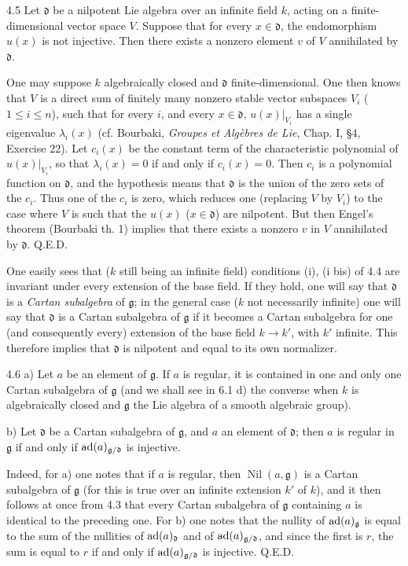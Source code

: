 \begin{lemma}{4.5}\label{XIII.4.5}
Let $\mathfrak d$ be a nilpotent Lie algebra over an infinite field
$k$, acting on a finite-dimensional vector space $V$. Suppose that
for every $x\in\mathfrak d$, the endomorphism $u(x)$ is not injective.
Then there exists a nonzero element $v$ of $V$ annihilated by
$\mathfrak d$.
\end{lemma}
One may suppose $k$ algebraically closed and $\mathfrak d$
finite-dimensional. One then knows that $V$ is a direct sum of finitely
many nonzero stable vector subspaces $V_i$ ($1\leq i\leq n$), such
that for every $i$, and every $x\in\mathfrak d$, $u(x)|_{V_i}$ has a
single eigenvalue $\lambda_i(x)$ (cf. Bourbaki, \emph{Groupes et
Alg\`ebres de Lie}, Chap. I, \S 4, Exercise 22). Let $c_i(x)$ be the
constant term of the characteristic polynomial of $u(x)|_{V_i}$, so
that $\lambda_i(x)=0$ if and only if $c_i(x)=0$. Then $c_i$ is a
polynomial function on $\mathfrak d$, and the hypothesis means that
$\mathfrak d$ is the union of the zero sets of the $c_i$. Thus one
of the $c_i$ is zero, which reduces one (replacing $V$ by $V_i$) to
the case where $V$ is such that the $u(x)$ ($x\in\mathfrak d$) are
nilpotent. But then Engel's theorem (Bourbaki \loccit th. 1) implies
that there exists a nonzero $v$ in $V$ annihilated by $\mathfrak d$.
\hfill Q.E.D.

One easily sees that ($k$ still being an infinite field) conditions
(i), (i bis) of 4.4 are invariant under every extension of the base
field. If they hold, one will say that $\mathfrak d$ is a \emph{Cartan
subalgebra} of $\mathfrak g$; in the general case ($k$ not necessarily
infinite) one will say that $\mathfrak d$ is a Cartan subalgebra of
$\mathfrak g$ if it becomes a Cartan subalgebra for one (and consequently
every) extension of the base field $k\to k'$, with $k'$ infinite.
This therefore implies that $\mathfrak d$ is nilpotent and equal
to its own normalizer.

\begin{proposition}{4.6}\label{XIII.4.6}
\noindent a) Let $a$ be an element of $\mathfrak g$. If $a$ is regular,
it is contained in one and only one Cartan subalgebra of $\mathfrak g$
(and we shall see in 6.1 d) the converse when $k$ is algebraically
closed and $\mathfrak g$ the Lie algebra of a smooth algebraic group).

\noindent b) Let $\mathfrak d$ be a Cartan subalgebra of $\mathfrak g$,
and $a$ an element of $\mathfrak d$; then $a$ is regular in
$\mathfrak g$ if and only if $\operatorname{ad}(a)_{\mathfrak g/\mathfrak d}$ is injective.
\end{proposition}
Indeed, for a) one notes that if $a$ is regular, then
$\operatorname{Nil}(a,\mathfrak g)$ is a Cartan subalgebra of
$\mathfrak g$ (for this is true over an infinite extension $k'$ of
$k$), and it then follows at once from 4.3 that every Cartan subalgebra
of $\mathfrak g$ containing $a$ is identical to the preceding one.
For b) one notes that the nullity of $\operatorname{ad}(a)_{\mathfrak g}$ is equal to the sum of the
nullities of $\operatorname{ad}(a)_{\mathfrak d}$ and of
$\operatorname{ad}(a)_{\mathfrak g/\mathfrak d}$, and since the first is $r$, the
sum is equal to $r$ if and only if $\operatorname{ad}(a)_{\mathfrak g/\mathfrak d}$
is injective. \hfill Q.E.D.

